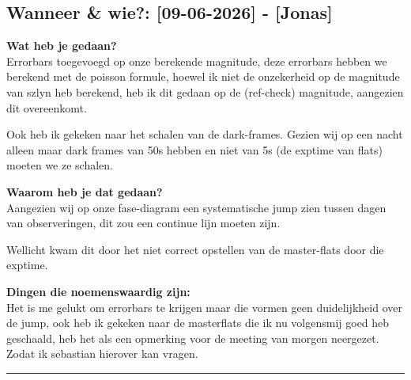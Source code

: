 
\subsection*{Wanneer \& wie?: [09-06-2026] - [Jonas]}

\textbf{Wat heb je gedaan?}\\
Errorbars toegevoegd op onze berekende magnitude, deze errorbars hebben we berekend  met de poisson formule, hoewel ik niet de onzekerheid op de magnitude van szlyn heb berekend, heb ik dit gedaan op de (ref-check) magnitude, aangezien dit overeenkomt. 

Ook heb ik gekeken naar het schalen van de dark-frames. Gezien wij op een nacht alleen maar dark frames van 50s hebben en niet van 5s (de exptime van flats) moeten we ze schalen.
\vspace{0.3cm} 

\noindent \textbf{Waarom heb je dat gedaan?}\\
Aangezien wij op onze fase-diagram een systematische jump zien tussen dagen van observeringen, dit zou een continue lijn moeten zijn.

Wellicht kwam dit door het niet correct opstellen van de master-flats door die exptime.

\noindent \textbf{Dingen die noemenswaardig zijn:}\\
Het is me gelukt om errorbars te krijgen maar die vormen geen duidelijkheid over de jump, ook heb ik gekeken naar de masterflats die ik nu volgensmij goed heb geschaald, heb het als een opmerking voor de meeting van morgen neergezet. Zodat ik sebastian hierover kan vragen.


\vspace{0.5cm}
\hrule 
\vspace{0.5cm}

